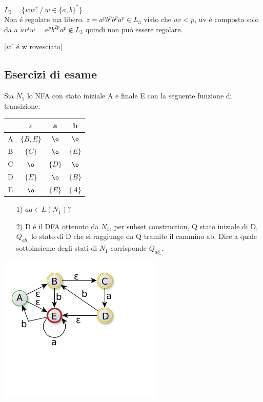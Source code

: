 $L_3 = \{ww^r \ / \ w \in \{ a,b \}^* \}$\\
Non \'e regolare ma libero.
$z = a^p b^p b^p a^p \in L_3$
visto che $uv < p$, uv \'e composta solo da a 
$u v^i w = a^pb^{2p}a^p \not\in L_3$ quindi non pu\'o essere regolare.

[$w^r$ \'e w rovesciato]
\subsection{Esercizi di esame}
Sia $N_1$ lo NFA con stato iniziale A e finale E con la seguente funzione di transizione:

\begin{center}
    \begin{tabular}{|c|c|c|c|}
        \hline
            &   $\varepsilon$      &   a           &   b           \\
        \hline
            A    &   $\{B, E\}$ &   $\o$        &  $\o$         \\
        \hline
            B    &   $\{ C \}$  &   $\o$        &  $\{ E \}$    \\
        \hline
            C    &   $\o$       &   $\{ D \}$   &  $\o$         \\
        \hline
            D    &   $\{ E \}$  &   $\o$        &  $\{ B \}$    \\
        \hline
            E    &   $\o$       &    $\{ E \}$  &  $\{ A \}$    \\
        \hline
    \end{tabular}
\end{center} 

\begin{itemize}
    \item[1)] $aa \in L(N_1)$?\\
    \item[2)] D \'e il DFA ottenuto da $N_1$, per subset construction, Q stato iniziale di D, $Q_{ab\_}$ lo stato di D che si 
    raggiunge da Q tramite il cammino ab. Dire a quale sottoinsieme degli stati di $N_1$ corrisponde $Q_{ab\_}$.\\    
\end{itemize}

\begin{center}
	\includegraphics[scale=0.6]{Chapters/Img/c02_19.png}\\
\end{center} 

